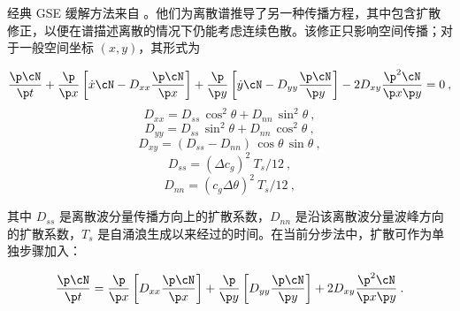 
\vspace{\baselineskip} 
\vspace{\baselineskip} 



经典 GSE 缓解方法来自 \cite{art:BH87}。他们为离散谱推导了另一种传播方程，其中包含扩散修正，以便在谱描述离散的情况下仍能考虑连续色散。该修正只影响空间传播；对于一般空间坐标 $(x,y)$，其形式为


\begin{equation}
\frac{\p \cN}{\p t} +
\frac{\p}{\p x} \left [ \dot{x} \cN 
           - D_{xx} \frac{\p \cN}{\p x} \right ] +
\frac{\p}{\p y} \left [ \dot{y} \cN 
           - D_{yy} \frac{\p \cN}{\p y} \right ] -
2 D_{xy} \frac{\p^2 \cN}{\p x \p y} = 0
\: , \label{eq:d_bal_0}\end{equation}  \begin{equation}
D_{xx} = D_{ss} \, \cos^2 \theta + D_{nn} \, \sin^2 \theta
\: , \label{eq:Dxx} \end{equation} \begin{equation}
D_{yy} = D_{ss} \, \sin^2 \theta + D_{nn} \, \cos^2 \theta
\: , \label{eq:Dyy} \end{equation}  \begin{equation}
D_{xy} = ( D_{ss} - D_{nn} ) \, \cos \theta \, \sin \theta
\: , \label{eq:Dxy} \end{equation} \begin{equation}
D_{ss} = (\Delta c_g )^2 \: T_s / 12
\: , \label{eq:Dss} \end{equation} \begin{equation}
D_{nn} =  ( c_g \Delta \theta )^2 \: T_s / 12
\: , \label{eq:Dnn} \end{equation}

\noindent
其中 $D_{ss}$ 是离散波分量传播方向上的扩散系数，$D_{nn}$ 是沿该离散波分量波峰方向的扩散系数，$T_s$ 是自涌浪生成以来经过的时间。在当前分步法中，扩散可作为单独步骤加入：


\begin{equation}
\frac{\p \cN}{\p t} = 
\frac{\p}{\p x} \left [ D_{xx} \frac{\p \cN}{\p x} \right ] +
\frac{\p}{\p y} \left [ D_{yy} \frac{\p \cN}{\p y} \right ] +
   2 D_{xy} \frac{\p^2 \cN}{\p x \p y}
\: . \label{eq:d_bal_1} \end{equation}

